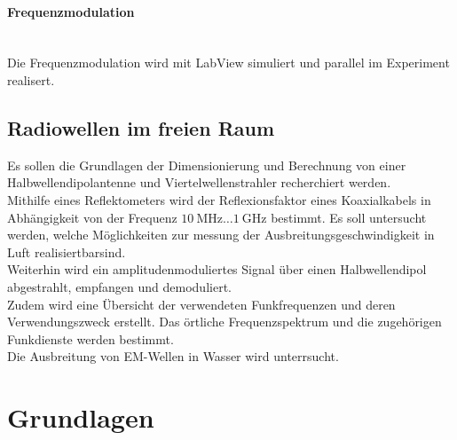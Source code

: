 \documentclass[a4paper,twoside,final]{article}
\begin{document}
\paragraph{Frequenzmodulation}$~$\\
Die Frequenzmodulation wird mit LabView simuliert und parallel im Experiment realisert.

\subsection{Radiowellen im freien Raum}
Es sollen die Grundlagen der Dimensionierung und Berechnung von einer Halbwellendipolantenne und Viertelwellenstrahler recherchiert werden.\\
Mithilfe eines Reflektometers wird der Reflexionsfaktor eines Koaxialkabels in Abhängigkeit von der Frequenz $\SI{10}{\mega\hertz}\hdots\SI{1}{\giga\hertz}$ bestimmt. Es soll untersucht werden, welche Möglichkeiten zur messung der Ausbreitungsgeschwindigkeit in Luft realisiertbarsind.\\
Weiterhin wird ein amplitudenmoduliertes Signal über einen Halbwellendipol abgestrahlt, empfangen und demoduliert. \\
Zudem wird eine Übersicht der verwendeten Funkfrequenzen und deren Verwendungszweck erstellt. Das örtliche Frequenzspektrum und die zugehörigen Funkdienste werden bestimmt.\\
Die Ausbreitung von EM-Wellen in Wasser wird unterrsucht.


\newpage
\section{Grundlagen} \label{sec:Grundlagen}
\end{document}
